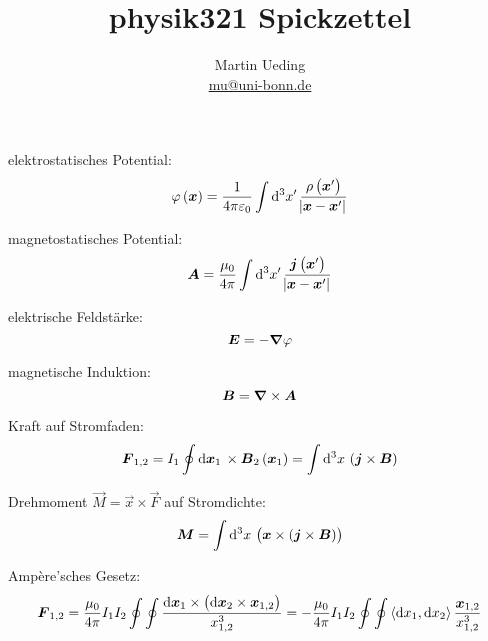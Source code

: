 

\hypersetup{
	pdftitle=
}


\title{physik321 Spickzettel}
\author{
	Martin Ueding \\
	\small{\href{mailto:mu@uni-bonn.de}{mu@uni-bonn.de}}
}




elektrostatisches Potential:
\[
	\varphi\del{\vec x} = \frac{1}{4 \pi \varepsilon_0} \int \dif{^3 x'} \, \frac{\rho\del{\vec x'}}{\abs{\vec x - \vec x'}}
\]

magnetostatisches Potential:
\[
	\vec A = \frac{\mu_0}{4 \pi} \int \dif{^3 x'} \, \frac{\vec j\del{\vec x'}}{\abs{\vec x - \vec x'}}
\]

elektrische Feldstärke:
\[
	\boldsymbol{E} = - \boldsymbol{\nabla} \varphi
\]

magnetische Induktion:
\[
	\boldsymbol{B} = \boldsymbol{\nabla} \times \boldsymbol{A}
\]

Kraft auf Stromfaden:
\[
	\vec F_{1,2}
	= I_1 \oint \dif{\vec x_1} \, \times \vec B_2\del{\vec x_1}
	= \int \dif{^3 x} \, \del{\vec j \times \vec B}
\]

Drehmoment $\vec M = \vec x \times \vec F$ auf Stromdichte:
\[
	\vec M
	= \int \dif{^3 x} \, \del{\vec x \times \del{\vec j \times \vec B}}
\]

Ampère'sches Gesetz:
\[
	\vec F_{1,2}
	= \frac{\mu_0}{4 \pi} I_1 I_2 \oint \oint \frac{\dif \vec x_1 \times \del{\dif \vec x_2 \times \vec x_{1,2}}}{x_{1,2}^3}
	= - \frac{\mu_0}{4 \pi} I_1 I_2 \oint \oint \inner{\dif x_1}{\dif x_2} \frac{\vec x_{1,2}}{x_{1,2}^3}
\]

%	
%	



